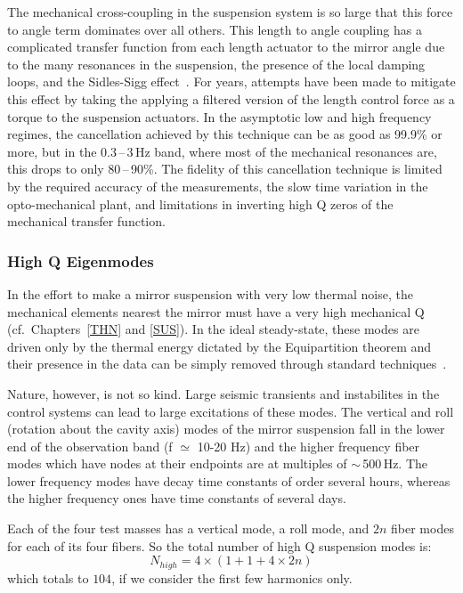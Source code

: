 The mechanical cross-coupling in the suspension system is so large that this force to angle term dominates over all others. This length to angle coupling has a complicated transfer function from each length actuator to the mirror angle due to the many resonances in the suspension, the presence of the local damping loops, and the Sidles-Sigg effect~\cite{Sidles:2006un, Hirose:10, Dooley:13}. For years, attempts have been made to mitigate this effect by taking the applying a filtered version of the length control force as a torque to the suspension actuators. In the asymptotic low and high frequency regimes, the cancellation achieved by this technique can be as good as 99.9\% or more,
but in the 0.3\,--\,3\,Hz band, where most of the mechanical resonances are,
this drops to only 80\,--\,90\%. The fidelity of this cancellation technique is limited by the required accuracy of the measurements, the slow time variation in the opto-mechanical plant, and limitations in inverting high Q zeros of the mechanical transfer function.


\subsubsection{High Q Eigenmodes}
In the effort to make a mirror suspension with very low thermal noise, the mechanical
elements nearest the mirror must have a very high mechanical Q
(cf.~Chapters~\ref{THN} and \ref{SUS}).
In the ideal steady-state, these modes are driven only by the thermal energy
dictated by the Equipartition theorem and their presence in the data can be simply
removed through standard techniques~\cite{Allen:1999wy, Finn:Violins, Searle:2003ib, Sintes:1998gq}.

Nature, however, is not so kind. Large seismic transients and instabilites in the control systems can lead to large excitations of these modes. The vertical and roll (rotation about the cavity axis)
modes of the mirror suspension fall in the lower end of the observation band
(f $\simeq$ 10-20 Hz) and the higher frequency fiber modes which have nodes at
their endpoints are at multiples of $\sim$\,500\,Hz. The lower frequency modes have
decay time constants of order several hours, whereas the higher frequency ones
have time constants of several days.

Each of the four test masses has a vertical mode, a roll mode, and $2n$ fiber modes
for each of its four fibers. So the total number of high Q suspension modes is:
\begin{equation}
N_{high} = 4 \times (1 + 1 + 4 \times 2n)
\end{equation}
which totals to $104$, if we consider the first few harmonics only.


